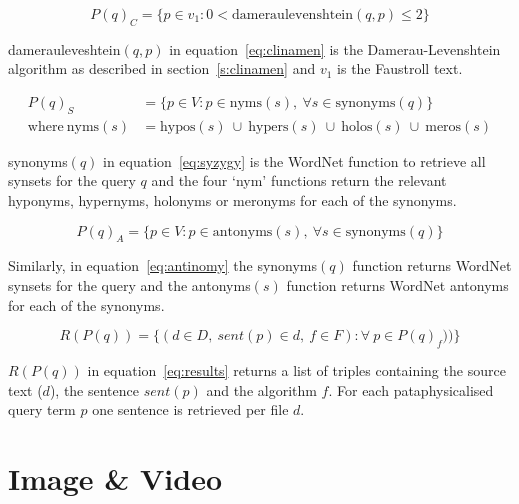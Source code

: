 \begin{equation}
  P(q)_C = \{p \in v_1: 0 < \text{dameraulevenshtein}(q,p) \leq 2\}
  \label{eq:clinamen}
\end{equation}

damerauleveshtein$(q,p)$ in equation~\ref{eq:clinamen} is the Damerau-Levenshtein algorithm as described in section~\ref{s:clinamen} and $v_1$ is the Faustroll text.

\begin{equation}
  \begin{split}
    P(q)_S &= \{p \in V: p \in \text{nyms}(s), \ \forall s \in \text{synonyms}(q)\}\\
    \text{where} \ \text{nyms}(s) &= \text{hypos}(s) \ \cup \ \text{hypers}(s) \ \cup \ \text{holos}(s) \ \cup \ \text{meros}(s)
  \end{split}
  \label{eq:syzygy}
\end{equation}

synonyms$(q)$ in equation~\ref{eq:syzygy} is the WordNet function to retrieve all synsets for the query $q$ and the four `nym' functions return the relevant hyponyms, hypernyms, holonyms or meronyms for each of the synonyms.

\begin{equation}
  P(q)_A = \{p \in V: p \in \text{antonyms}(s), \ \forall s \in \text{synonyms}(q)\}
  \label{eq:antinomy}
\end{equation}

Similarly, in equation~\ref{eq:antinomy} the synonyms$(q)$ function returns WordNet synsets for the query and the antonyms$(s)$ function returns WordNet antonyms for each of the synonyms.

\begin{equation}
  R(P(q)) = \{(d \in D, \ sent(p) \in d, \ f \in F): \forall \ p \in P(q)_f)) \}
  \label{eq:results}
\end{equation}

$R(P(q))$ in equation~\ref{eq:results} returns a list of triples containing the source text ($d$), the sentence $sent(p)$ and the algorithm $f$. For each pataphysicalised query term $p$ one sentence is retrieved per file $d$.


\section{Image \& Video}
\label{s:imgvid}

